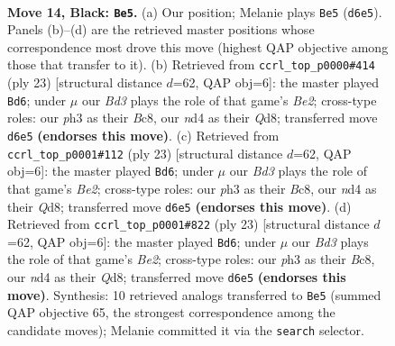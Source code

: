 \documentclass[11pt]{article}
\begin{document}
\clearpage

\begin{figure}[p]\centering
\begin{subfigure}{0.46\textwidth}\centering
\resizebox{\linewidth}{!}{%
\newchessgame
\chessboard[
  setfen={r1bq1rk1/pp3ppp/3b2n1/3p4/B2N4/3P3P/PPP2PP1/R1BQR1K1 b - - 2 14},
  showmover=false,
  pgfstyle=straightmove, color=movearrow, markmove={d6-e5}
]}
\caption{}
\end{subfigure}\hfill
\begin{subfigure}{0.46\textwidth}\centering
\resizebox{\linewidth}{!}{%
\newchessgame
\chessboard[
  setfen={r1bq1rk1/4bppp/p1p5/1p1nR3/8/1BPP4/PP3PPP/RNBQ2K1 b - - 0 12},
  showmover=false,
  pgfstyle=straightmove, color=movearrow, markmove={e7-d6}
]}
\caption{}
\end{subfigure}
\\[4pt]
\begin{subfigure}{0.46\textwidth}\centering
\resizebox{\linewidth}{!}{%
\newchessgame
\chessboard[
  setfen={r1bq1rk1/4bppp/p1p5/1p1nR3/8/1BPP4/PP3PPP/RNBQ2K1 b - - 0 12},
  showmover=false,
  pgfstyle=straightmove, color=movearrow, markmove={e7-d6}
]}
\caption{}
\end{subfigure}\hfill
\begin{subfigure}{0.46\textwidth}\centering
\resizebox{\linewidth}{!}{%
\newchessgame
\chessboard[
  setfen={r1bq1rk1/4bppp/p1p5/1p1nR3/8/1BPP4/PP3PPP/RNBQ2K1 b - - 0 12},
  showmover=false,
  pgfstyle=straightmove, color=movearrow, markmove={e7-d6}
]}
\caption{}
\end{subfigure}
\caption{\textbf{Move 14, Black: \texttt{Be5}.} (a) Our position; Melanie plays \texttt{Be5} (\texttt{d6e5}). Panels (b)--(d) are the retrieved master positions whose correspondence most drove this move (highest QAP objective among those that transfer to it). (b) Retrieved from \texttt{ccrl\_top\_p0000\#414} (ply 23) [structural distance $d$=62, QAP obj=6]: the master played \texttt{Bd6}; under $\mu$ our \emph{Bd3} plays the role of that game's \emph{Be2}; cross-type roles: our \emph{p}h3 as their \emph{B}c8, our \emph{n}d4 as their \emph{Q}d8; transferred move \texttt{d6e5} \textbf{(endorses this move)}. (c) Retrieved from \texttt{ccrl\_top\_p0001\#112} (ply 23) [structural distance $d$=62, QAP obj=6]: the master played \texttt{Bd6}; under $\mu$ our \emph{Bd3} plays the role of that game's \emph{Be2}; cross-type roles: our \emph{p}h3 as their \emph{B}c8, our \emph{n}d4 as their \emph{Q}d8; transferred move \texttt{d6e5} \textbf{(endorses this move)}. (d) Retrieved from \texttt{ccrl\_top\_p0001\#822} (ply 23) [structural distance $d$=62, QAP obj=6]: the master played \texttt{Bd6}; under $\mu$ our \emph{Bd3} plays the role of that game's \emph{Be2}; cross-type roles: our \emph{p}h3 as their \emph{B}c8, our \emph{n}d4 as their \emph{Q}d8; transferred move \texttt{d6e5} \textbf{(endorses this move)}. Synthesis: 10 retrieved analogs transferred to \texttt{Be5} (summed QAP objective 65, the strongest correspondence among the candidate moves); Melanie committed it via the \texttt{search} selector.}
\label{fig:thought-m27}
\end{figure}
\end{document}
